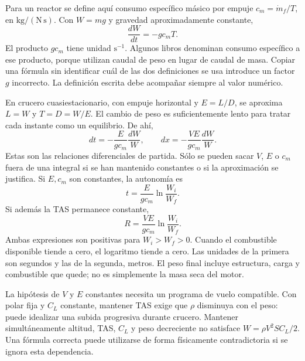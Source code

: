 Para un reactor se define aquí consumo específico másico por empuje $c_m=\dot m_f/T$, en $\mathrm{kg/(N\,s)}$. Con $W=mg$ y gravedad aproximadamente constante,
\begin{equation}
\frac{dW}{dt}=-g c_m T.
\end{equation}
El producto $gc_m$ tiene unidad $\mathrm{s^{-1}}$. Algunos libros denominan consumo específico a ese producto, porque utilizan caudal de peso en lugar de caudal de masa. Copiar una fórmula sin identificar cuál de las dos definiciones se usa introduce un factor $g$ incorrecto. La definición escrita debe acompañar siempre al valor numérico.

En crucero cuasiestacionario, con empuje horizontal y $E=L/D$, se aproxima $L=W$ y $T=D=W/E$. El cambio de peso es suficientemente lento para tratar cada instante como un equilibrio. De ahí,
\begin{equation}
 dt=-\frac{E}{gc_m}\frac{dW}{W},\qquad
 dx=-\frac{VE}{gc_m}\frac{dW}{W}.
\end{equation}
Estas son las relaciones diferenciales de partida. Sólo se pueden sacar $V$, $E$ o $c_m$ fuera de una integral si se han mantenido constantes o si la aproximación se justifica. Si $E,c_m$ son constantes, la autonomía es
\begin{equation}\label{eq:11-endjet}
 t=\frac{E}{gc_m}\ln\frac{W_i}{W_f}.
\end{equation}
Si además la TAS permanece constante,
\begin{equation}\label{eq:11-rangejet}
 R=\frac{VE}{gc_m}\ln\frac{W_i}{W_f}.
\end{equation}
Ambas expresiones son positivas para $W_i>W_f>0$. Cuando el combustible disponible tiende a cero, el logaritmo tiende a cero. Las unidades de la primera son segundos y las de la segunda, metros. El peso final incluye estructura, carga y combustible que quede; no es simplemente la masa seca del motor.

La hipótesis de $V$ y $E$ constantes necesita un programa de vuelo compatible. Con polar fija y $C_L$ constante, mantener TAS exige que $\rho$ disminuya con el peso: puede idealizar una subida progresiva durante crucero. Mantener simultáneamente altitud, TAS, $C_L$ y peso decreciente no satisface $W=\rho V^2SC_L/2$. Una fórmula correcta puede utilizarse de forma físicamente contradictoria si se ignora esta dependencia.

